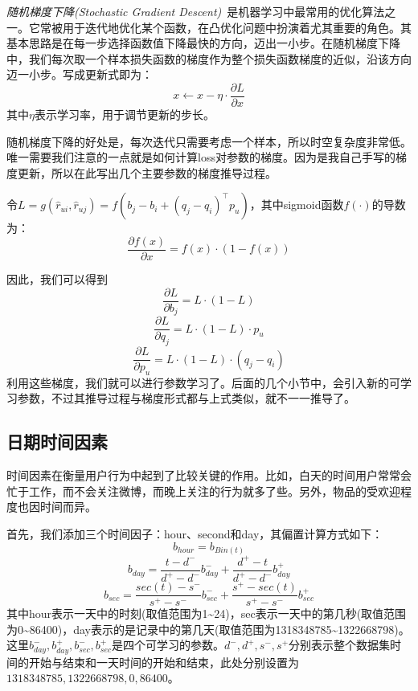 \documentclass[12pt]{article} %
\newcommand\qq{\boldsymbol{\mathit{q}}}
\newcommand\pp{\boldsymbol{\mathit{p}}}
\begin{document}
\begin{sloppypar}
{\em 随机梯度下降(Stochastic Gradient Descent)}~\cite{robbins1951stochastic}是机器学习中最常用的优化算法之一。它常被用于迭代地优化某个函数，在凸优化问题中扮演着尤其重要的角色。其基本思路是在每一步选择函数值下降最快的方向，迈出一小步。在随机梯度下降中，我们每次取一个样本损失函数的梯度作为整个损失函数梯度的近似，沿该方向迈一小步。写成更新式即为：
\begin{equation}
	x \leftarrow x - \eta \cdot \frac{\partial L}{\partial x}
\end{equation}
其中$\eta$表示学习率，用于调节更新的步长。

随机梯度下降的好处是，每次迭代只需要考虑一个样本，所以时空复杂度非常低。唯一需要我们注意的一点就是如何计算loss对参数的梯度。因为是我自己手写的梯度更新，所以在此写出几个主要参数的梯度推导过程。

令$L = g(\hat{r}_{ui}, \hat{r}_{uj}) = f(b_j - b_i + (\qq_j - \qq_i)^\top \pp_u)$，其中sigmoid函数$f(\cdot)$的导数为：
\begin{equation}
\frac{\partial f(x)}{\partial x} = f(x) \cdot (1 - f(x))
\end{equation}

因此，我们可以得到
\begin{equation}
\frac{\partial L}{\partial b_j} = L \cdot (1 - L)
\end{equation}
\begin{equation}
\frac{\partial L}{\partial \qq_j} = L \cdot (1 - L) \cdot \pp_u
\end{equation}
\begin{equation}
\frac{\partial L}{\partial \pp_u} = L \cdot (1 - L) \cdot \left(\qq_j - \qq_i\right)
\end{equation}
利用这些梯度，我们就可以进行参数学习了。后面的几个小节中，会引入新的可学习参数，不过其推导过程与梯度形式都与上式类似，就不一一推导了。


\subsection{日期时间因素}

时间因素在衡量用户行为中起到了比较关键的作用。比如，白天的时间用户常常会忙于工作，而不会关注微博，而晚上关注的行为就多了些。另外，物品的受欢迎程度也因时间而异。

首先，我们添加三个时间因子：hour、second和day，其偏置计算方式如下：
\begin{equation}
	b_{hour} = b_{Bin(t)}
\end{equation}
\begin{equation}
	b_{day} = \frac{t - d^-}{d^+ - d^-} b_{day}^- + \frac{d^+ - t}{d^+ - d^-} b_{day}^+
\end{equation}
\begin{equation}
	b_{sec} = \frac{sec(t) - s^-}{s^+ - s^-} b_{sec}^- + \frac{s^+ - sec(t)}{s^+ - s^-} b_{sec}^+
\end{equation}
其中hour表示一天中的时刻(取值范围为1\~{}24)，sec表示一天中的第几秒(取值范围为0\~{}86400)，day表示的是记录中的第几天(取值范围为1318348785\~{}1322668798)。这里$b_{day}^-,b_{day}^+,b_{sec}^-,b_{sec}^+$是四个可学习的参数。$d^-,d^+,s^-,s^+$分别表示整个数据集时间的开始与结束和一天时间的开始和结束，此处分别设置为$1318348785,1322668798,0,86400$。


\end{sloppypar}
\end{document}
